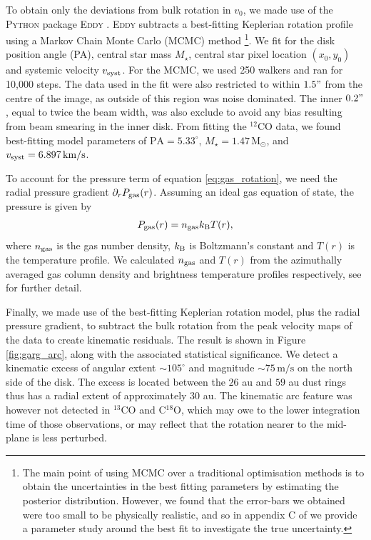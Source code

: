 To obtain only the deviations from bulk rotation in $v_0$, we made use of the \textsc{Python} package \textsc{Eddy} \citep{teague2019}.
\textsc{Eddy} subtracts a best-fitting Keplerian rotation profile using a Markov Chain Monte Carlo (MCMC) method \citep{foreman-mackey2013}\footnote{The main point of using MCMC over a traditional optimisation methods is to obtain the uncertainties in the best fitting parameters by estimating the posterior distribution. However, we found that the error-bars we obtained were too small to be physically realistic, and so in appendix C of \citet{garg2022} we provide a parameter study around the best fit to investigate the true uncertainty.}.
We fit for the disk position angle (PA), central star mass $M_\star$, central star pixel location $(x_0,y_0)$ and systemic velocity $v_{\rm syst}$.
For the MCMC, we used 250 walkers and ran for 10,000 steps.
The data used in the fit were also restricted to within $1.5"$ from the centre of the image, as outside of this region was noise dominated.
The inner $0.2"$, equal to twice the beam width, was also exclude to avoid any bias resulting from beam smearing in the inner disk.
From fitting the $^{12}$CO data, we found best-fitting model parameters of $\mathrm{PA} = 5.33^\circ$, $M_\star = 1.47 \, \mathrm{M_\odot}$, and $v_{\rm syst} = 6.897 \, \mathrm{km/s}$.

To account for the pressure term of equation \ref{eq:gas_rotation}, we need the radial pressure gradient $\partial_r P_{\rm gas}(r)$.
Assuming an ideal gas equation of state, the pressure is given by 
\begin{align}
    P_{\rm gas}(r) = n_{\rm gas} k_{\rm B} T(r),
\end{align}
where $n_{\rm gas}$ is the gas number density, $k_{\rm B}$ is Boltzmann's constant and $T(r)$ is the temperature profile.
We calculated $n_{\rm gas}$ and $T(r)$ from the azimuthally averaged gas column density and brightness temperature profiles respectively, see \citet{garg2022} for further detail.

Finally, we made use of the best-fitting Keplerian rotation model, plus the radial pressure gradient, to subtract the bulk rotation from the peak velocity maps of the data to create kinematic residuals.
The result is shown in Figure \ref{fig:garg_arc}, along with the associated statistical significance.
We detect a kinematic excess of angular extent $\sim 105^\circ$ and magnitude $\sim 75 \, \mathrm{m/s}$ on the north side of the disk.
The excess is located between the $26$ au and $59$ au dust rings thus has a radial extent of approximately $30$ au.
The kinematic arc feature was however not detected in $^{13}$CO and C$^{18}$O, which may owe to the lower integration time of those observations, or may reflect that the rotation nearer to the mid-plane is less perturbed.

